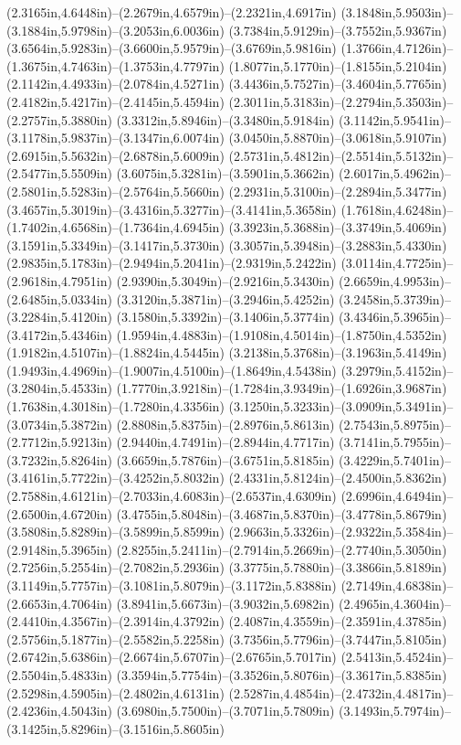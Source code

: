 (2.3165in,4.6448in)--(2.2679in,4.6579in)--(2.2321in,4.6917in) (3.1848in,5.9503in)--(3.1884in,5.9798in)--(3.2053in,6.0036in) (3.7384in,5.9129in)--(3.7552in,5.9367in) (3.6564in,5.9283in)--(3.6600in,5.9579in)--(3.6769in,5.9816in) (1.3766in,4.7126in)--(1.3675in,4.7463in)--(1.3753in,4.7797in) (1.8077in,5.1770in)--(1.8155in,5.2104in) (2.1142in,4.4933in)--(2.0784in,4.5271in) (3.4436in,5.7527in)--(3.4604in,5.7765in) (2.4182in,5.4217in)--(2.4145in,5.4594in) (2.3011in,5.3183in)--(2.2794in,5.3503in)--(2.2757in,5.3880in) (3.3312in,5.8946in)--(3.3480in,5.9184in) (3.1142in,5.9541in)--(3.1178in,5.9837in)--(3.1347in,6.0074in) (3.0450in,5.8870in)--(3.0618in,5.9107in) (2.6915in,5.5632in)--(2.6878in,5.6009in) (2.5731in,5.4812in)--(2.5514in,5.5132in)--(2.5477in,5.5509in) (3.6075in,5.3281in)--(3.5901in,5.3662in) (2.6017in,5.4962in)--(2.5801in,5.5283in)--(2.5764in,5.5660in) (2.2931in,5.3100in)--(2.2894in,5.3477in) (3.4657in,5.3019in)--(3.4316in,5.3277in)--(3.4141in,5.3658in) (1.7618in,4.6248in)--(1.7402in,4.6568in)--(1.7364in,4.6945in) (3.3923in,5.3688in)--(3.3749in,5.4069in) (3.1591in,5.3349in)--(3.1417in,5.3730in) (3.3057in,5.3948in)--(3.2883in,5.4330in) (2.9835in,5.1783in)--(2.9494in,5.2041in)--(2.9319in,5.2422in) (3.0114in,4.7725in)--(2.9618in,4.7951in) (2.9390in,5.3049in)--(2.9216in,5.3430in) (2.6659in,4.9953in)--(2.6485in,5.0334in) (3.3120in,5.3871in)--(3.2946in,5.4252in) (3.2458in,5.3739in)--(3.2284in,5.4120in) (3.1580in,5.3392in)--(3.1406in,5.3774in) (3.4346in,5.3965in)--(3.4172in,5.4346in) (1.9594in,4.4883in)--(1.9108in,4.5014in)--(1.8750in,4.5352in) (1.9182in,4.5107in)--(1.8824in,4.5445in) (3.2138in,5.3768in)--(3.1963in,5.4149in) (1.9493in,4.4969in)--(1.9007in,4.5100in)--(1.8649in,4.5438in) (3.2979in,5.4152in)--(3.2804in,5.4533in) (1.7770in,3.9218in)--(1.7284in,3.9349in)--(1.6926in,3.9687in) (1.7638in,4.3018in)--(1.7280in,4.3356in) (3.1250in,5.3233in)--(3.0909in,5.3491in)--(3.0734in,5.3872in) (2.8808in,5.8375in)--(2.8976in,5.8613in) (2.7543in,5.8975in)--(2.7712in,5.9213in) (2.9440in,4.7491in)--(2.8944in,4.7717in) (3.7141in,5.7955in)--(3.7232in,5.8264in) (3.6659in,5.7876in)--(3.6751in,5.8185in) (3.4229in,5.7401in)--(3.4161in,5.7722in)--(3.4252in,5.8032in) (2.4331in,5.8124in)--(2.4500in,5.8362in) (2.7588in,4.6121in)--(2.7033in,4.6083in)--(2.6537in,4.6309in) (2.6996in,4.6494in)--(2.6500in,4.6720in) (3.4755in,5.8048in)--(3.4687in,5.8370in)--(3.4778in,5.8679in) (3.5808in,5.8289in)--(3.5899in,5.8599in) (2.9663in,5.3326in)--(2.9322in,5.3584in)--(2.9148in,5.3965in) (2.8255in,5.2411in)--(2.7914in,5.2669in)--(2.7740in,5.3050in) (2.7256in,5.2554in)--(2.7082in,5.2936in) (3.3775in,5.7880in)--(3.3866in,5.8189in) (3.1149in,5.7757in)--(3.1081in,5.8079in)--(3.1172in,5.8388in) (2.7149in,4.6838in)--(2.6653in,4.7064in) (3.8941in,5.6673in)--(3.9032in,5.6982in) (2.4965in,4.3604in)--(2.4410in,4.3567in)--(2.3914in,4.3792in) (2.4087in,4.3559in)--(2.3591in,4.3785in) (2.5756in,5.1877in)--(2.5582in,5.2258in) (3.7356in,5.7796in)--(3.7447in,5.8105in) (2.6742in,5.6386in)--(2.6674in,5.6707in)--(2.6765in,5.7017in) (2.5413in,5.4524in)--(2.5504in,5.4833in) (3.3594in,5.7754in)--(3.3526in,5.8076in)--(3.3617in,5.8385in) (2.5298in,4.5905in)--(2.4802in,4.6131in) (2.5287in,4.4854in)--(2.4732in,4.4817in)--(2.4236in,4.5043in) (3.6980in,5.7500in)--(3.7071in,5.7809in) (3.1493in,5.7974in)--(3.1425in,5.8296in)--(3.1516in,5.8605in) 
